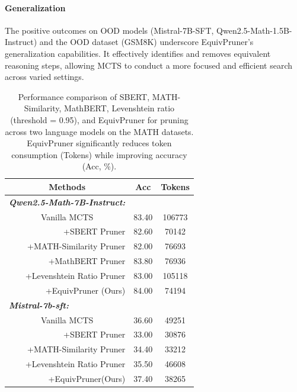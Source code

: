 \documentclass[11pt]{article}
\begin{document}
\paragraph{Generalization}
The positive outcomes on OOD models (Mistral-7B-SFT, Qwen2.5-Math-1.5B-Instruct) and the OOD dataset (GSM8K) underscore EquivPruner's generalization capabilities. It effectively identifies and removes equivalent reasoning steps, allowing MCTS to conduct a more focused and efficient search across varied settings.

\begin{table}[t]
\centering
\caption{Performance comparison of SBERT, MATH-Similarity, MathBERT, Levenshtein ratio (threshold = 0.95), and EquivPruner for pruning across two language models on the MATH datasets. EquivPruner significantly reduces token consumption (Tokens) while improving accuracy (Acc, \%).}
\label{tab:baseline}
\begin{tabular}{rcc}
\hline
\multicolumn{1}{c}{Methods}                                     & Acc                  & Tokens               \\ \hline
\multicolumn{1}{l}{\textit{\textbf{Qwen2.5-Math-7B-Instruct:}}} & \multicolumn{1}{l}{} & \multicolumn{1}{l}{} \\
\multicolumn{1}{c}{Vanilla MCTS}                                & 83.40                & 106773               \\
+SBERT Pruner                                                   & 82.60                & 70142                \\
+MATH-Similarity Pruner                                         & 82.00                & 76693                \\
+MathBERT Pruner                                         & 83.80                & 76936                \\
+Levenshtein Ratio Pruner                                       & 83.00                & 105118               \\
+EquivPruner (Ours)                                             & 84.00                & 74194                \\ \hline
\multicolumn{1}{l}{\textit{\textbf{Mistral-7b-sft:}}}           & \multicolumn{1}{l}{} & \multicolumn{1}{l}{} \\
\multicolumn{1}{c}{Vanilla MCTS}                                & 36.60                & 49251                \\
+SBERT Pruner                                                   & 33.00                & 30876                \\
+MATH-Similarity Pruner                                         & 34.40                & 33212                \\
+Levenshtein Ratio Pruner                                       & 35.50                & 46608                \\
+EquivPruner(Ours)                                              & 37.40                & 38265                \\ \hline
\end{tabular}
\end{table}
\end{document}
